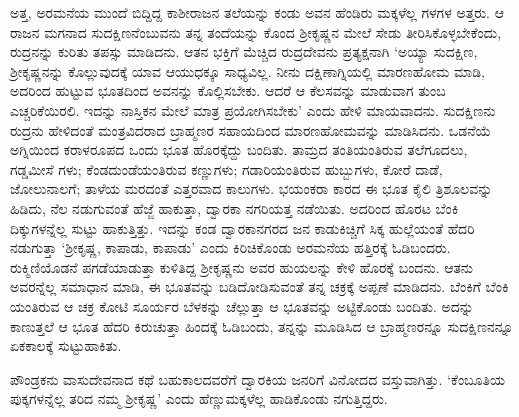 ಅತ್ತ, ಅರಮನೆಯ ಮುಂದೆ ಬಿದ್ದಿದ್ದ ಕಾಶೀರಾಜನ ತಲೆಯನ್ನು ಕಂಡು ಅವನ ಹೆಂಡಿರು ಮಕ್ಕಳೆಲ್ಲ ಗಳಗಳ ಅತ್ತರು. ಆ ರಾಜನ ಮಗನಾದ ಸುದಕ್ಷಿಣನೆಂಬುವನು ತನ್ನ ತಂದೆಯನ್ನು ಕೊಂದ ಶ್ರೀಕೃಷ್ಣನ ಮೇಲೆ ಸೇಡು ತೀರಿಸಿಕೊಳ್ಳಬೇಕೆಂದು, ರುದ್ರನನ್ನು ಕುರಿತು ತಪಸ್ಸು ಮಾಡಿದನು. ಆತನ ಭಕ್ತಿಗೆ ಮೆಚ್ಚಿದ ರುದ್ರದೇವನು ಪ್ರತ್ಯಕ್ಷನಾಗಿ ‘ಅಯ್ಯಾ ಸುದಕ್ಷಿಣ, ಶ್ರೀಕೃಷ್ಣನನ್ನು ಕೊಲ್ಲುವುದಕ್ಕೆ ಯಾವ ಆಯುಧಕ್ಕೂ ಸಾಧ್ಯವಿಲ್ಲ. ನೀನು ದಕ್ಷಿಣಾಗ್ನಿಯಲ್ಲಿ ಮಾರಣಹೋಮ ಮಾಡಿ, ಅದರಿಂದ ಹುಟ್ಟುವ ಭೂತದಿಂದ ಅವನನ್ನು ಕೊಲ್ಲಿಸಬೇಕು. ಆದರೆ ಆ ಕೆಲಸವನ್ನು ಮಾಡುವಾಗ ತುಂಬ ಎಚ್ಚರಿಕೆಯಿರಲಿ. ಇದನ್ನು ನಾಸ್ತಿಕನ ಮೇಲೆ ಮಾತ್ರ ಪ್ರಯೋಗಿಸಬೇಕು’ ಎಂದು ಹೇಳಿ ಮಾಯವಾದನು. ಸುದಕ್ಷಿಣನು ರುದ್ರನು ಹೇಳಿದಂತೆ ಮಂತ್ರವಿದರಾದ ಬ್ರಾಹ್ಮಣರ ಸಹಾಯದಿಂದ ಮಾರಣಹೋಮವನ್ನು ಮಾಡಿಸಿದನು. ಒಡನೆಯೆ ಅಗ್ನಿಯಿಂದ ಕರಾಳರೂಪದ ಒಂದು ಭೂತ ಹೊರಕ್ಕೆದ್ದು ಬಂದಿತು. ತಾಮ್ರದ ತಂತಿಯಂತಿರುವ ತಲೆಗೂದಲು, ಗಡ್ಡಮೀಸೆ ಗಳು; ಕೆಂಡದುಂಡೆಯಂತಿರುವ ಕಣ್ಣುಗಳು; ಗಡಾರಿಯಂತಿರುವ ಹುಬ್ಬುಗಳು, ಕೋರೆ ದಾಡೆ, ಜೋಲುನಾಲಗೆ; ತಾಳೆಯ ಮರದಂತೆ ಎತ್ತರವಾದ ಕಾಲುಗಳು. ಭಯಂಕರಾ ಕಾರದ ಈ ಭೂತ ಕೈಲಿ ತ್ರಿಶೂಲವನ್ನು ಹಿಡಿದು, ನೆಲ ನಡುಗುವಂತೆ ಹೆಜ್ಜೆ ಹಾಕುತ್ತಾ, ದ್ವಾರಕಾ ನಗರಿಯತ್ತ ನಡೆಯಿತು. ಅದರಿಂದ ಹೊರಟ ಬೆಂಕಿ ದಿಕ್ಕುಗಳನ್ನೆಲ್ಲ ಸುಟ್ಟು ಹಾಕುತ್ತಿತ್ತು. ಇದನ್ನು ಕಂಡ ದ್ವಾರಕಾನಗರದ ಜನ ಕಾಡುಕಿಚ್ಚಿಗೆ ಸಿಕ್ಕ ಹುಲ್ಲೆಯಂತೆ ಹೆದರಿ ನಡುಗುತ್ತಾ ‘ಶ್ರೀಕೃಷ್ಣ, ಕಾಪಾಡು, ಕಾಪಾಡು’ ಎಂದು ಕಿರಿಚಿಕೊಂಡು ಅರಮನೆಯ ಹತ್ತಿರಕ್ಕೆ ಓಡಿಬಂದರು. ರುಕ್ಮಿಣಿಯೊಡನೆ ಪಗಡೆಯಾಡುತ್ತಾ ಕುಳಿತಿದ್ದ ಶ್ರೀಕೃಷ್ಣನು ಅವರ ಹುಯಲನ್ನು ಕೇಳಿ ಹೊರಕ್ಕೆ ಬಂದನು. ಆತನು ಅವರನ್ನೆಲ್ಲ ಸಮಾಧಾನ ಮಾಡಿ, ಈ ಭೂತವನ್ನು ಬಡಿದೋಡಿಸುವಂತೆ ತನ್ನ ಚಕ್ರಕ್ಕೆ ಅಪ್ಪಣೆ ಮಾಡಿದನು. ಬೆಂಕಿಗೆ ಬೆಂಕಿ ಯಂತಿರುವ ಆ ಚಕ್ರ ಕೋಟಿ ಸೂರ್ಯರ ಬೆಳಕನ್ನು ಚೆಲ್ಲುತ್ತಾ ಆ ಭೂತವನ್ನು ಅಟ್ಟಿಕೊಂಡು ಬಂದಿತು. ಅದನ್ನು ಕಾಣುತ್ತಲೆ ಆ ಭೂತ ಹೆದರಿ ಕಿರುಚುತ್ತಾ ಹಿಂದಕ್ಕೆ ಓಡಿಬಂದು, ತನ್ನನ್ನು ಮೂಡಿಸಿದ ಆ ಬ್ರಾಹ್ಮಣರನ್ನೂ ಸುದಕ್ಷಿಣನನ್ನೂ ಏಕಕಾಲಕ್ಕೆ ಸುಟ್ಟುಹಾಕಿತು.

ಪೌಂಡ್ರಕನು ವಾಸುದೇವನಾದ ಕಥೆ ಬಹುಕಾಲದವರೆಗೆ ದ್ವಾರಕಿಯ ಜನರಿಗೆ ವಿನೋದದ ವಸ್ತುವಾಗಿತ್ತು. ‘ಕೆಂಬೂತಿಯ ಪುಕ್ಕಗಳನ್ನೆಲ್ಲ ತರಿದ ನಮ್ಮ ಶ್ರೀಕೃಷ್ಣ’ ಎಂದು ಹೆಣ್ಣುಮಕ್ಕಳೆಲ್ಲ ಹಾಡಿಕೊಂಡು ನಗುತ್ತಿದ್ದರು.

